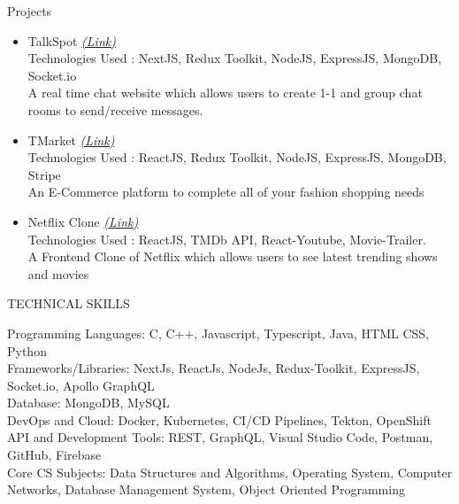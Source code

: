 \documentclass{resume} %
\begin{document}
\begin{rSection}{Projects}
   \begin{itemize}

    \item TalkSpot
   \href{https://github.com/tushargahlaut/talkspot-chat-app}{\emph{(Link)}} 
   \\Technologies Used : NextJS, Redux Toolkit, NodeJS, ExpressJS, MongoDB, Socket.io 
   \\{\normalfont A real time chat website which allows users to create 1-1 and group chat rooms to send/receive messages.}
   
   \item TMarket
   \href{https://github.com/tushargahlaut/TMarket}{\emph{(Link)}}
   \\Technologies Used : ReactJS, Redux Toolkit, NodeJS, ExpressJS, MongoDB, Stripe
   \\{\normalfont An E-Commerce platform to complete all of your fashion shopping needs}

    \item Netflix Clone
   \href{https://netflix-clone-df7878.netlify.app/}{\emph{(Link)}} 
   \\Technologies Used : ReactJS, TMDb API, React-Youtube, Movie-Trailer. 
   \\{\normalfont A Frontend Clone of Netflix which allows users to see latest trending shows and movies}
   
   \end{itemize}
\end{rSection}

\begin{rSection}{TECHNICAL SKILLS}


Programming Languages: {\normalfont C, C++, Javascript, Typescript, Java, HTML CSS, Python}
\\
Frameworks/Libraries: {\normalfont NextJs, ReactJs, NodeJs, Redux-Toolkit, ExpressJS,  Socket.io, Apollo GraphQL}
 \\
 Database: {\normalfont MongoDB, MySQL}
 \\
 DevOps and Cloud: {\normalfont Docker, Kubernetes, CI/CD Pipelines, Tekton, OpenShift}
 \\
 API and Development Tools: {\normalfont REST, GraphQL, Visual Studio Code, Postman, GitHub, Firebase}
 \\
 Core CS Subjects: {\normalfont Data Structures and Algorithms, Operating System, Computer Networks, Database Management System, Object Oriented Programming}
 


\end{rSection}
\end{document}
